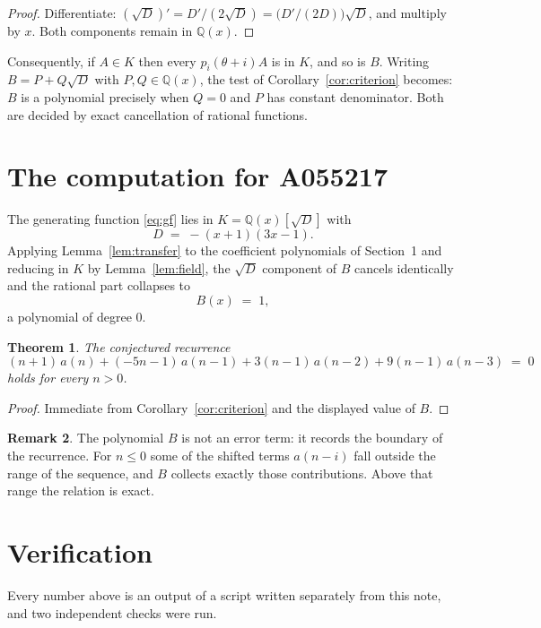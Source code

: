 \documentclass[11pt,a4paper]{article}
\theoremstyle{plain}
\newtheorem{theorem}{Theorem}
\theoremstyle{definition}
\newtheorem{remark}[theorem]{Remark}
\begin{document}
\begin{proof}
Differentiate: $(\sqrt{D})'=D'/(2\sqrt{D})=\bigl(D'/(2D)\bigr)\sqrt{D}$, and multiply by
$x$. Both components remain in $\mathbb{Q}(x)$.
\end{proof}

Consequently, if $A\in K$ then every $p_{i}(\theta+i)A$ is in $K$, and so is $B$. Writing
$B=P+Q\sqrt{D}$ with $P,Q\in\mathbb{Q}(x)$, the test of Corollary~\ref{cor:criterion}
becomes: $B$ is a polynomial precisely when $Q=0$ and $P$ has constant denominator. Both
are decided by exact cancellation of rational functions.

\section{The computation for A055217}

The generating function \eqref{eq:gf} lies in $K=\mathbb{Q}(x)[\sqrt{D}]$ with
\[
D \;=\; - \left(x + 1\right) \left(3 x - 1\right) .
\]
Applying Lemma~\ref{lem:transfer} to the coefficient polynomials of Section~1 and reducing
in $K$ by Lemma~\ref{lem:field}, the $\sqrt{D}$ component of $B$ cancels identically and
the rational part collapses to
\[
B(x)\;=\;1 ,
\]
a polynomial of degree $0$.

\begin{theorem}
The conjectured recurrence
\[
(n + 1)\,a(n) + (- 5 n - 1)\,a(n-1) + 3 \left(n - 1\right)\,a(n-2) + 9 \left(n - 1\right)\,a(n-3) \;=\;0
\]
holds for every $n>0$.
\end{theorem}

\begin{proof}
Immediate from Corollary~\ref{cor:criterion} and the displayed value of $B$.
\end{proof}

\begin{remark}
The polynomial $B$ is not an error term: it records the boundary of the recurrence. For
$n\le0$ some of the shifted terms $a(n-i)$ fall outside the range of the sequence,
and $B$ collects exactly those contributions. Above that range the relation is exact.
\end{remark}

\section{Verification}

Every number above is an output of a script written separately from this note, and two
independent checks were run.
\end{document}
